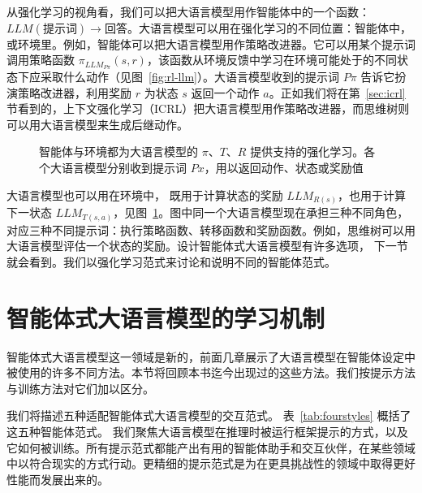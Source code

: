从强化学习的视角看，我们可以把大语言模型用作智能体中的一个函数：$LLM(\text{提示词}) \rightarrow \text{回答}$。大语言模型可以用在强化学习的不同位置：智能体中，或环境里。例如，智能体可以把大语言模型用作策略改进器。它可以用某个提示词调用策略函数 $\pi_{LLM_{P\pi}}(s,r)$，该函数从环境反馈中学习在环境可能处于的不同状态下应采取什么动作（见图~\ref{fig:rl-llm}）。大语言模型收到的提示词 $P\pi$ 告诉它扮演策略改进器，利用奖励 $r$ 为状态 $s$ 返回一个动作 $a$。正如我们将在第~\ref{sec:icrl} 节看到的，上下文强化学习（ICRL）把大语言模型用作策略改进器，而思维树则可以用大语言模型来生成后继动作。

\begin{figure}
  \begin{center}
    
    \caption{智能体与环境都为大语言模型的 $\pi$、$T$、$R$ 提供支持的强化学习。各个大语言模型分别收到提示词 $Px$，用以返回动作、状态或奖励值}\label{fig:rl-llm2}
  \end{center}
\end{figure}

大语言模型也可以用在环境中，%
既用于计算状态的奖励 $LLM_{R(s)}$，也用于计算下一状态 $LLM_{T(s,a)}$，见图~\ref{fig:rl-llm2}。图中同一个大语言模型现在承担三种不同角色，对应三种不同提示词：执行策略函数、转移函数和奖励函数。例如，思维树可以用大语言模型评估一个状态的奖励。设计智能体式大语言模型有许多选项，
下一节就会看到。我们以强化学习范式来讨论和说明不同的智能体范式。

 

\section{智能体式大语言模型的学习机制}\label{sec:styles}
智能体式大语言模型这一领域是新的，前面几章展示了大语言模型在智能体设定中被使用的许多不同方法。本节将回顾本书迄今出现过的这些方法。我们按提示方法与训练方法对它们加以区分。


我们将描述五种适配智能体式大语言模型的交互范式。
表~\ref{tab:fourstyles} 概括了这五种智能体范式。%
我们聚焦大语言模型在推理时被运行框架提示的方式，以及它如何被训练。所有提示范式都能产出有用的智能体助手和交互伙伴，在某些领域中以符合现实的方式行动。更精细的提示范式是为在更具挑战性的领域中取得更好性能而发展出来的。

